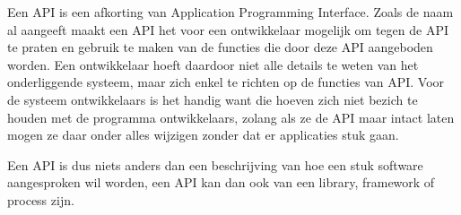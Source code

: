 Een API is een afkorting van Application Programming Interface. Zoals de naam al aangeeft maakt een API het voor een ontwikkelaar mogelijk om tegen de API te praten en gebruik te maken van de functies die door deze API aangeboden worden. Een ontwikkelaar hoeft daardoor niet alle details te weten van het onderliggende systeem, maar zich enkel te richten op de functies van API. Voor de systeem ontwikkelaars is het handig want die hoeven zich niet bezich te houden met de programma ontwikkelaars, zolang als ze de API maar intact laten mogen ze daar onder alles wijzigen zonder dat er applicaties stuk gaan.

Een API is dus niets anders dan een beschrijving van hoe een stuk software aangesproken wil worden, een API kan dan ook van een library, framework of process zijn.

